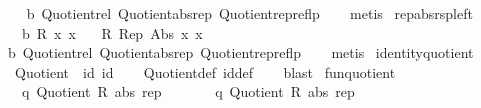 \begin{isabellebody}
%
\isadelimproof
\ \ %
\endisadelimproof
%
\isatagproof
{}\isamarkupfalse%
\ b\ Quotient{}{\isacharunderscore}{\kern0pt}rel\ Quotient{}{\isacharunderscore}{\kern0pt}abs{\isacharunderscore}{\kern0pt}rep\ Quotient{}{\isacharunderscore}{\kern0pt}rep{\isacharunderscore}{\kern0pt}reflp\isanewline
\ \ \isamarkupfalse%
\ metis%
\endisatagproof
{\isafoldproof}%
%
\isadelimproof
\isanewline
%
\endisadelimproof
\isanewline
{}\isamarkupfalse%
\ rep{\isacharunderscore}{\kern0pt}abs{\isacharunderscore}{\kern0pt}rsp{\isacharunderscore}{\kern0pt}left{\isacharcolon}{\kern0pt}\isanewline
\ \ \ b{\isacharcolon}{\kern0pt}\ {\isachardoublequoteopen}R\ x{}\ x{}{\isachardoublequoteclose}\isanewline
\ \ \ {\isachardoublequoteopen}R\ {\isacharparenleft}{\kern0pt}Rep\ {\isacharparenleft}{\kern0pt}Abs\ x{}{\isacharparenright}{\kern0pt}{\isacharparenright}{\kern0pt}\ x{}{\isachardoublequoteclose}\isanewline
%
\isadelimproof
\ \ %
\endisadelimproof
%
\isatagproof
{}\isamarkupfalse%
\ b\ Quotient{}{\isacharunderscore}{\kern0pt}rel\ Quotient{}{\isacharunderscore}{\kern0pt}abs{\isacharunderscore}{\kern0pt}rep\ Quotient{}{\isacharunderscore}{\kern0pt}rep{\isacharunderscore}{\kern0pt}reflp\isanewline
\ \ \isamarkupfalse%
\ metis%
\endisatagproof
{\isafoldproof}%
%
\isadelimproof
\isanewline
%
\endisadelimproof
\isanewline
{}\isamarkupfalse%
\isanewline
\isanewline
{}\isamarkupfalse%
\ identity{\isacharunderscore}{\kern0pt}quotient{}{\isacharcolon}{\kern0pt}\isanewline
\ \ {\isachardoublequoteopen}Quotient{}\ {\isacharparenleft}{\kern0pt}{\isacharequal}{\kern0pt}{\isacharparenright}{\kern0pt}\ id\ id{\isachardoublequoteclose}\isanewline
%
\isadelimproof
\ \ %
\endisadelimproof
%
\isatagproof
{}\isamarkupfalse%
\ Quotient{}{\isacharunderscore}{\kern0pt}def\ id{\isacharunderscore}{\kern0pt}def\isanewline
\ \ \isamarkupfalse%
\ blast%
\endisatagproof
{\isafoldproof}%
%
\isadelimproof
\isanewline
%
\endisadelimproof
\isanewline
{}\isamarkupfalse%
\ fun{\isacharunderscore}{\kern0pt}quotient{}{\isacharcolon}{\kern0pt}\isanewline
\ \ \ q{}{\isacharcolon}{\kern0pt}\ {\isachardoublequoteopen}Quotient{}\ R{}\ abs{}\ rep{}{\isachardoublequoteclose}\isanewline
\ \ \ \ \ \ \ q{}{\isacharcolon}{\kern0pt}\ {\isachardoublequoteopen}Quotient{}\ R{}\ abs{}\ rep{}{\isachardoublequoteclose}\isanewline

\end{isabellebody}
